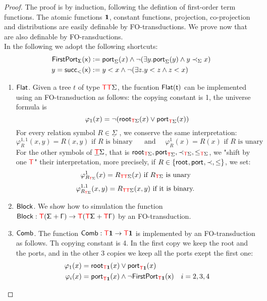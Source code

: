     \begin{proof}
    The proof is by induction, following the defintion of first-order term functions. The atomic functions $\mathbf{1}$, constant functions, projection, co-projection and distributions are easily definable by FO-transductions.  
    We prove now that are also definable by FO-ransductions. 
    \\
    
    In the following we adopt the following shortcuts:
    \begin{align*}
    \sf{FirstPort}_\Sigma (x)& := \mathsf{port}_{\Sigma}(x)\wedge \neg (\exists y. \mathsf{port}_{\Sigma}(y)\wedge y\prec_\Sigma x)\\
    y=\sf{succ}_< (x) &:=  y<x \wedge \neg (\exists z. y<z \wedge z<x)
    \end{align*} 
    \begin{enumerate}
    \item $\sf{Flat}$. Given a tree $t$ of type ${\color{red}{\mathsf T}}{\color{red}{\mathsf T}}\Sigma$, the fucntion $\sf{Flat}(t)$ can be implemented using an FO-transduction as follows: the copying constant is 1, the universe formula is 
    \[\varphi_1(x) = \neg (\mathsf{root}_{{\color{red}{\mathsf T}}\Sigma}(x) \vee \mathsf{port}_{{\color{red}{\mathsf T}}\Sigma}(x) )  \]
    For every relation symbol $R\in\underline \Sigma$ , we conserve the same interpretation:
    \[\varphi_R^{1,1}(x,y)=R(x,y) \text{ if $R$ is binary }
    \quad \text{ and } \quad\varphi_R^{1}(x)=R(x) \text{ if $R$ is unary }\] 
    For the other symbols of $\underline{{\color{red}{\mathsf T}}}\Sigma$, that is $\mathsf{root}_{{\color{red}{\mathsf T}}\Sigma},\mathsf{port}_{{\color{red}{\mathsf T}}\Sigma}, \prec_{{\color{red}{\mathsf T}}\Sigma}, \leq_{{\color{red}{\mathsf T}}\Sigma}$, we "shift by one ${\color{red}{\mathsf T}}$" their interpretation, more precisely, if $R\in\{\mathsf{root}_{}, \mathsf{port}_{}, \prec, \leq\}$, we set:
    \[ \varphi^1_{R_{{\color{red}{\mathsf T}}\Sigma}}(x) = R_{{\color{red}{\mathsf T}}{\color{red}{\mathsf T}}\Sigma}(x) \text{ if $R_{{\color{red}{\mathsf T}}\Sigma}$ is unary } \]
    \[\varphi^{1,1}_{R_{{\color{red}{\mathsf T}}\Sigma}}(x,y) = R_{{\color{red}{\mathsf T}}{\color{red}{\mathsf T}}\Sigma}(x,y) \text{ if it is binary. }\] 
    \item $\sf{Block}$. We show how to simulation the function $\sf{Block}:{\color{red}{\mathsf T}} (\Sigma + \Gamma) \to {\color{red}{\mathsf T}} ({\color{red}{\mathsf T}} \Sigma + {\color{red}{\mathsf T}} \Gamma)$ by an FO-transduction. 
    \item $\sf{Comb}$. The function $\sf{Comb}:{\color{red}{\mathsf T}} \mathbf{1}\to{\color{red}{\mathsf T}}\mathbf{1}$ is implemented by an FO-transduction as follows. Th copying constant is 4. 
    In the first copy we keep the root and the ports, and in the other 3 copies we keep all the ports exept the first one:
    \begin{align*}
    \varphi_1(x)&=\mathsf{root}_{{\color{red}{\mathsf T}}\mathbf{1}}(x) \vee \mathsf{port}_{{\color{red}{\mathsf T}}\mathbf{1}}(x)\\
    \varphi_i(x)&=\mathsf{port}_{{\color{red}{\mathsf T}}\mathbf{1}}(x)\wedge \neg \sf{FirstPort}_{{\color{red}{\mathsf T}}\mathbf{1}}(x)& i=2,3,4
    \end{align*}
    

\end{enumerate}
\end{proof}
